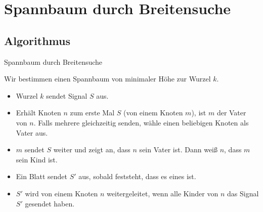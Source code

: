\documentclass[18pt]{beamer}
\begin{document}
\section{Spannbaum durch Breitensuche}
\subsection{Algorithmus}
\begin{frame}{Spannbaum durch Breitensuche}
	
	Wir bestimmen einen Spannbaum von minimaler Höhe zur Wurzel $k$.
	\begin{itemize}
		\item Wurzel $k$ sendet Signal $S$ aus.
		\item Erhält Knoten $n$ zum erste Mal $S$ (von einem Knoten $m$), ist $m$ der Vater von $n$. Falls mehrere gleichzeitig senden, wähle einen beliebigen Knoten als Vater aus.
		\item $m$ sendet $S$ weiter und zeigt an, dass $n$ sein Vater ist. Dann weiß $n$, dass $m$ sein Kind ist.
		\item Ein Blatt sendet $S'$ aus, sobald feststeht, dass es eines ist. 
		\item $S'$ wird von einem Knoten $n$ weitergeleitet, wenn alle Kinder von $n$ das Signal $S'$ gesendet haben.
	\end{itemize}
\end{frame}
\end{document}
